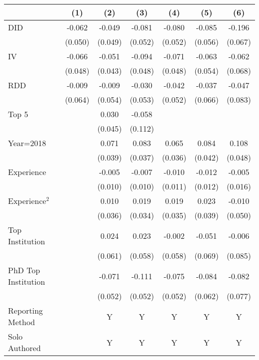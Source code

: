 \begin{tabular}{l*{6}{c}}
\hline\hline
                &\multicolumn{1}{c}{(1)}&\multicolumn{1}{c}{(2)}&\multicolumn{1}{c}{(3)}&\multicolumn{1}{c}{(4)}&\multicolumn{1}{c}{(5)}&\multicolumn{1}{c}{(6)}\\
\hline
DID             &   -0.062&   -0.049&   -0.081&   -0.080&   -0.085&   -0.196\\
                &  (0.050)&  (0.049)&  (0.052)&  (0.052)&  (0.056)&  (0.067)\\
IV              &   -0.066&   -0.051&   -0.094&   -0.071&   -0.063&   -0.062\\
                &  (0.048)&  (0.043)&  (0.048)&  (0.048)&  (0.054)&  (0.068)\\
RDD             &   -0.009&   -0.009&   -0.030&   -0.042&   -0.037&   -0.047\\
                &  (0.064)&  (0.054)&  (0.053)&  (0.052)&  (0.066)&  (0.083)\\
Top 5           &         &    0.030&   -0.058&         &         &         \\
                &         &  (0.045)&  (0.112)&         &         &         \\
Year=2018       &         &    0.071&    0.083&    0.065&    0.084&    0.108\\
                &         &  (0.039)&  (0.037)&  (0.036)&  (0.042)&  (0.048)\\
Experience      &         &   -0.005&   -0.007&   -0.010&   -0.012&   -0.005\\
                &         &  (0.010)&  (0.010)&  (0.011)&  (0.012)&  (0.016)\\
Experience$^2$  &         &    0.010&    0.019&    0.019&    0.023&   -0.010\\
                &         &  (0.036)&  (0.034)&  (0.035)&  (0.039)&  (0.050)\\
Top Institution &         &    0.024&    0.023&   -0.002&   -0.051&   -0.006\\
                &         &  (0.061)&  (0.058)&  (0.058)&  (0.069)&  (0.085)\\
PhD Top Institution&         &   -0.071&   -0.111&   -0.075&   -0.084&   -0.082\\
                &         &  (0.052)&  (0.052)&  (0.052)&  (0.062)&  (0.077)\\
Reporting Method &         &        Y&        Y&        Y&        Y&        Y\\
Solo Authored   &         &        Y&        Y&        Y&        Y&        Y\\

\end{tabular}

